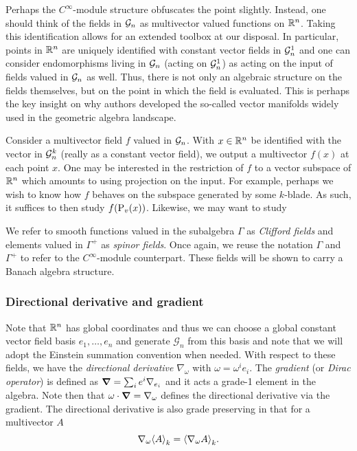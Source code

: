 Perhaps the $C^\infty$-module structure obfuscates the point slightly.  Instead, one should think of the fields in $\mathcal{G}_n$ as multivector valued functions on $\mathbb{R}^n$.  Taking this identification allows for an extended toolbox at our disposal.  In particular, points in $\mathbb{R}^n$ are uniquely identified with constant vector fields in $\mathcal{G}_n^1$ and one can consider endomorphisms living in $\mathcal{G}_n$ (acting on $\mathcal{G}_n^1$) as acting on the input of fields valued in $\mathcal{G}_n$ as well.  Thus, there is not only an algebraic structure on the fields themselves, but on the point in which the field is evaluated.  This is perhaps the key insight on why authors developed the so-called vector manifolds widely used in the geometric algebra landscape.

\begin{example}
    Consider a multivector field $f$ valued in $\mathcal{G}_n$.  With $x\in \mathbb{R}^n$ be identified with the vector in $\mathcal{G}_n^k$ (really as a constant vector field), we output a multivector $f(x)$ at each point $x$.  One may be interested in the restriction of $f$ to a vector subspace of $\mathbb{R}^n$ which amounts to using projection on the input.  For example, perhaps we wish to know how $f$ behaves on the subspace generated by some $k$-blade.  As such, it suffices to then study $f(\operatorname{P}_{v}(x))$.  Likewise, we may want to study 
\end{example}

We refer to smooth functions valued in the subalgebra $\Gamma$ as \emph{Clifford fields} and elements valued in $\Gamma^+$ as \emph{spinor fields}. Once again, we reuse the notation $\Gamma$ and $\Gamma^+$ to refer to the $C^\infty$-module counterpart. These fields will be shown to carry a Banach algebra structure. 


\subsubsection{Directional derivative and gradient}

Note that $\mathbb{R}^n$ has global coordinates and thus we can choose a global constant vector field basis $e_1,\dots,e_n$ and generate $\mathcal{G}_n$ from this basis and note that we will adopt the Einstein summation convention when needed. With respect to these fields, we have the \emph{directional derivative} $\nabla_\omega$ with $\omega = \omega^i e_i$. The \emph{gradient} (or \emph{Dirac operator}) is defined as $\boldsymbol{\nabla} = \sum_{i} e^i \nabla_{e_i}$ and it acts a grade-1 element in the algebra.   Note then that $\omega \cdot \boldsymbol{\nabla} = \nabla_\omega$ defines the directional derivative via the gradient. The directional derivative is also grade preserving in that for a multivector $A$
\[
\nabla_\omega \proj{k}{A} = \proj{k}{\nabla_\omega A}.
\]  

